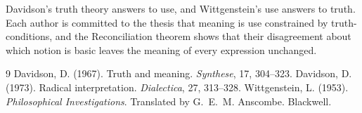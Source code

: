 \documentclass{situationist-preprint}
\begin{document}
Davidson's truth theory answers to use, and Wittgenstein's use answers to truth. Each author is committed to the thesis that meaning is use constrained by truth-conditions, and the Reconciliation theorem shows that their disagreement about which notion is basic leaves the meaning of every expression unchanged.

\begin{thebibliography}{9}\small
{} Davidson, D. (1967). Truth and meaning. \emph{Synthese}, 17, 304--323.
 Davidson, D. (1973). Radical interpretation. \emph{Dialectica}, 27, 313--328.
 Wittgenstein, L. (1953). \emph{Philosophical Investigations}. Translated by G.~E.~M. Anscombe. Blackwell.
\end{thebibliography}
\end{document}
